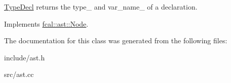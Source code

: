 \hyperlink{classfcal_1_1ast_1_1TypeDecl}{Type\+Decl} returns the type\+\_\+ and var\+\_\+name\+\_\+ of a declaration. 

Implements \hyperlink{classfcal_1_1ast_1_1Node_a81865f5a1df593708a39bf492952742a}{fcal\+::ast\+::\+Node}.



The documentation for this class was generated from the following files\+:\begin{DoxyCompactItemize}
\item 
include/ast.\+h\item 
src/ast.\+cc\end{DoxyCompactItemize}
